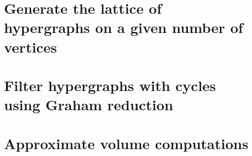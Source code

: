 \section*{Generate the lattice of hypergraphs on a given number of vertices}

\pagebreak

\section*{Filter hypergraphs with cycles using Graham reduction}

\pagebreak

\section*{Approximate volume computations}



